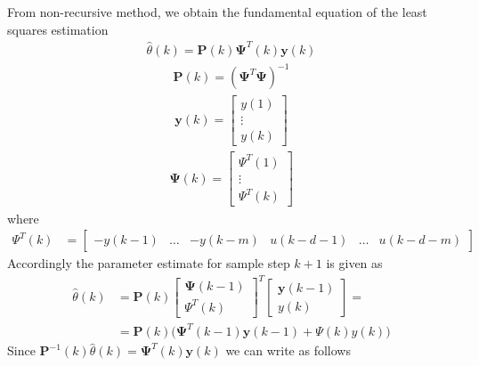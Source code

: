 \documentclass[11pt,a4paper,oneside]{book}
\numberwithin{equation}{section}
\theoremstyle{it}
\theoremstyle{definition}
\begin{document}
From non-recursive method, we obtain the fundamental equation of the least 
squares estimation
\begin{equation}\label{eq:17}
	\begin{aligned}
		\hat{\theta}(k)=\mathbf{P}(k)\mathbf{\Psi}^T(k)\mathbf{y}(k)
	\end{aligned}
\end{equation}
\begin{equation}
	\begin{aligned}
		\mathbf{P}(k)=\left(\mathbf{\Psi}^T\mathbf{\Psi}\right)^{-1}
	\end{aligned}
\end{equation}
\begin{equation}
	\begin{aligned}
		\mathbf{y}(k)=
		\begin{bmatrix}
			y(1)\\
			\vdots\\
			y(k)
		\end{bmatrix}
	\end{aligned}
\end{equation}
\begin{equation}
	\begin{aligned}
		\mathbf{\Psi}(k)=
		\begin{bmatrix}
			\Psi^T(1)\\
			\vdots\\
			\Psi^T(k)
		\end{bmatrix}
	\end{aligned}
\end{equation}
where
\begin{equation}
	\begin{aligned}
		\Psi^T(k)&=
		\begin{bmatrix}
			-y(k-1) & \dots & -y(k-m) & u(k-d-1) & \dots & u(k-d-m)
		\end{bmatrix}
	\end{aligned}
\end{equation}
Accordingly the parameter estimate for sample step $k+1$ is given as
\begin{equation}
	\begin{aligned}
		\hat{\theta}(k) &= \mathbf{P}(k)
		\begin{bmatrix}
			\mathbf{\Psi}(k-1)\\[6pt]
			\Psi^T(k)
		\end{bmatrix}^T
		\begin{bmatrix}
			\mathbf{y}(k-1)\\[6pt]
			y(k)
		\end{bmatrix}= \\[6pt]
		&= 
		\mathbf{P}(k)\Big(\mathbf{\Psi}^T(k-1)\mathbf{y}(k-1)+\Psi(k)y(k)\Big) 
	\end{aligned}
\end{equation}
Since $\mathbf{P}^{-1}(k)\hat{\theta}(k)=\mathbf{\Psi}^T(k)\mathbf{y}(k)$ we 
can write as follows
\end{document}
